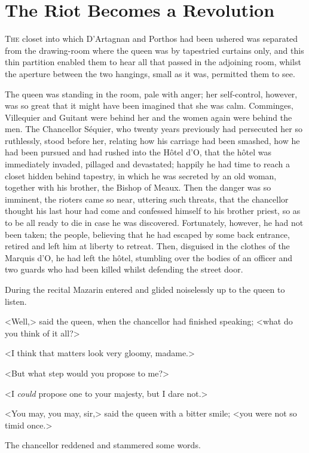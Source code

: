 \chapter{The Riot Becomes a Revolution}

 \lettrine{T}{he} closet into which D'Artagnan and Porthos had been ushered was separated from the drawing-room where the queen was by tapestried curtains only, and this thin partition enabled them to hear all that passed in the adjoining room, whilst the aperture between the two hangings, small as it was, permitted them to see.

The queen was standing in the room, pale with anger; her self-control, however, was so great that it might have been imagined that she was calm. Comminges, Villequier and Guitant were behind her and the women again were behind the men. The Chancellor Séquier, who twenty years previously had persecuted her so ruthlessly, stood before her, relating how his carriage had been smashed, how he had been pursued and had rushed into the Hôtel d'O\doubleemdash, that the hôtel was immediately invaded, pillaged and devastated; happily he had time to reach a closet hidden behind tapestry, in which he was secreted by an old woman, together with his brother, the Bishop of Meaux. Then the danger was so imminent, the rioters came so near, uttering such threats, that the chancellor thought his last hour had come and confessed himself to his brother priest, so as to be all ready to die in case he was discovered. Fortunately, however, he had not been taken; the people, believing that he had escaped by some back entrance, retired and left him at liberty to retreat. Then, disguised in the clothes of the Marquis d'O\doubleemdash, he had left the hôtel, stumbling over the bodies of an officer and two guards who had been killed whilst defending the street door.

During the recital Mazarin entered and glided noiselessly up to the queen to listen.

<Well,> said the queen, when the chancellor had finished speaking; <what do you think of it all?>

<I think that matters look very gloomy, madame.>

<But what step would you propose to me?>

<I \emph{could} propose one to your majesty, but I dare not.>

<You may, you may, sir,> said the queen with a bitter smile; <you were not so timid once.>

The chancellor reddened and stammered some words.

